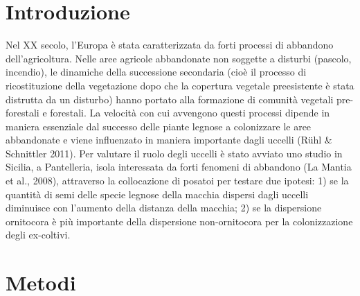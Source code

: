 \section*{Introduzione}


Nel XX secolo, l{\textquoteright}Europa \`e stata caratterizzata da
forti processi di abbandono dell{\textquoteright}agricoltura. Nelle
aree agricole abbandonate non soggette a disturbi (pascolo, incendio),
le dinamiche della successione secondaria (cio\`e il processo di
ricostituzione della vegetazione dopo che la copertura vegetale
preesistente \`e stata distrutta da un disturbo) hanno portato alla
formazione di comunit\`a vegetali pre-forestali e forestali. La
velocit\`a con cui avvengono questi processi dipende in maniera
essenziale dal successo delle piante legnose a colonizzare le aree
abbandonate e viene influenzato in maniera importante dagli uccelli
(R\"uhl \& Schnittler 2011). Per valutare il ruolo degli uccelli \`e
stato avviato uno studio in Sicilia, a Pantelleria, isola interessata
da forti fenomeni di abbandono (La Mantia et al., 2008), attraverso la
collocazione di posatoi per testare due ipotesi: 1) se la quantit\`a di
semi delle specie legnose della macchia dispersi dagli uccelli
diminuisce con l{\textquoteright}aumento della distanza della macchia;
2) se la dispersione ornitocora \`e pi\`u importante della dispersione
non-ornitocora per la colonizzazione degli ex-coltivi. 

\section*{Metodi}

